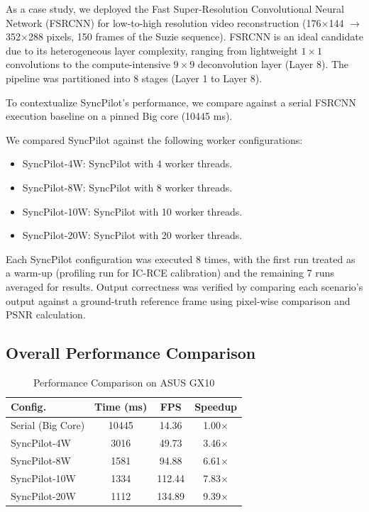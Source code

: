 \documentclass[runningheads]{llncs}
\begin{document}
As a case study, we deployed the Fast Super-Resolution Convolutional Neural Network (FSRCNN) \cite{dong2016fsrcnn} for low-to-high resolution video reconstruction (176$\times$144 $\rightarrow$ 352$\times$288 pixels, 150 frames of the Suzie sequence). FSRCNN is an ideal candidate due to its heterogeneous layer complexity, ranging from lightweight $1\times1$ convolutions to the compute-intensive $9\times9$ deconvolution layer (Layer 8). The pipeline was partitioned into 8 stages (Layer 1 to Layer 8).

To contextualize SyncPilot's performance, we compare against a serial FSRCNN execution baseline on a pinned Big core (10445 ms).

We compared SyncPilot against the following worker configurations:
\begin{itemize}
    \item SyncPilot-4W: SyncPilot with 4 worker threads.
    \item SyncPilot-8W: SyncPilot with 8 worker threads.
    \item SyncPilot-10W: SyncPilot with 10 worker threads.
    \item SyncPilot-20W: SyncPilot with 20 worker threads.
\end{itemize}

Each SyncPilot configuration was executed 8 times, with the first run treated as a warm-up (profiling run for IC-RCE calibration) and the remaining 7 runs averaged for results. Output correctness was verified by comparing each scenario's output against a ground-truth reference frame using pixel-wise comparison and PSNR calculation.

\subsection{Overall Performance Comparison}
\begin{table}
\caption{Performance Comparison on ASUS GX10}\label{tab:throughput}
\centering
\small
\begin{tabular}{|l|c|c|c|}
\hline
\textbf{Config.} & \textbf{Time (ms)} & \textbf{FPS} & \textbf{Speedup} \\
\hline
Serial (Big Core) & 10445 & 14.36 & 1.00$\times$ \\
SyncPilot-4W & 3016 & 49.73 & 3.46$\times$ \\
SyncPilot-8W & 1581 & 94.88 & 6.61$\times$ \\
SyncPilot-10W & 1334 & 112.44 & 7.83$\times$ \\
SyncPilot-20W & 1112 & 134.89 & 9.39$\times$ \\
\hline
\end{tabular}
\end{table}
\end{document}
